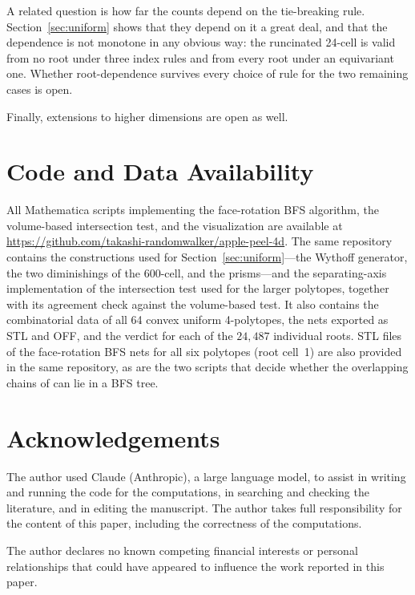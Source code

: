 \documentclass[11pt,letterpaper]{article}
\begin{document}
A related question is how far the counts depend on the tie-breaking
rule.
Section~\ref{sec:uniform} shows that they depend on it a great deal,
and that the dependence is not monotone in any obvious way: the
runcinated 24-cell is valid from no root under three index rules and
from every root under an equivariant one.
Whether root-dependence survives every choice of rule for the two
remaining cases is open.

Finally, extensions to higher dimensions are open as well.

\section*{Code and Data Availability}

All Mathematica scripts implementing the face-rotation BFS algorithm,
the volume-based intersection test, and the visualization are available
at \url{https://github.com/takashi-randomwalker/apple-peel-4d}.
The same repository contains the constructions used for
Section~\ref{sec:uniform}---the Wythoff generator, the two
diminishings of the 600-cell, and the prisms---and the
separating-axis implementation of the intersection test used for the
larger polytopes, together with its agreement check against the
volume-based test.
It also contains the combinatorial data of all 64 convex uniform
4-polytopes, the nets exported as STL and OFF, and the verdict for
each of the $24{,}487$ individual roots.
STL files of the face-rotation BFS nets for all six polytopes (root cell~1)
are also provided in the same repository, as are the two scripts that decide
whether the overlapping chains of \cite{DevadossHarveyRichter2026} can lie
in a BFS tree.

\section*{Acknowledgements}

The author used Claude (Anthropic), a large language model, to assist
in writing and running the code for the computations, in searching
and checking the literature, and in editing the manuscript.
The author takes full responsibility for the content of this paper,
including the correctness of the computations.

The author declares no known competing financial interests or personal
relationships that could have appeared to influence the work reported
in this paper.
\end{document}
